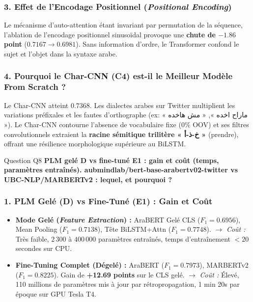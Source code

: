 \documentclass[11pt,a4paper]{article}
\begin{document}
\subsubsection*{3. Effet de l'Encodage Positionnel (\textit{Positional Encoding})}
Le mécanisme d'auto-attention étant invariant par permutation de la séquence, l'ablation de l'encodage positionnel sinusoïdal provoque une \textbf{chute de $-1.86$ point} ($0.7167 \to 0.6981$). Sans information d'ordre, le Transformer confond le sujet et l'objet dans la syntaxe arabe.

\subsubsection*{4. Pourquoi le Char-CNN (C4) est-il le Meilleur Modèle From Scratch ?}
Le Char-CNN atteint $\mathbf{0.7368}$. Les dialectes arabes sur Twitter multiplient les variations préfixales et les fautes d'orthographe (ex: « ماراح اخده », « مش هاخده »). Le Char-CNN contourne l'absence de vocabulaire fixe ($0\%$ OOV) et ses filtres convolutionnels extraient la \textbf{racine sémitique trilitère « خ-ذ-أ »} (prendre), offrant une résilience morphologique supérieure au BiLSTM.

\vspace{0.3cm}

\begin{questionbox}{Question Q8}
\textbf{PLM gelé D vs fine-tuné E1 : gain et coût (temps, paramètres entraînés). aubmindlab/bert-base-arabertv02-twitter vs UBC-NLP/MARBERTv2 : lequel, et pourquoi ?}
\end{questionbox}

\subsubsection*{1. PLM Gelé (D) vs Fine-Tuné (E1) : Gain et Coût}
\begin{itemize}[noitemsep]
    \item \textbf{Mode Gelé (\textit{Feature Extraction}) :} AraBERT Gelé CLS ($F_1 = 0.6956$), Mean Pooling ($F_1 = 0.7138$), Tête BiLSTM+Attn ($F_1 = 0.7748$).  
    $\to$ \textit{Coût :} Très faible, $2\,300$ à $400\,000$ paramètres entraînés, temps d'entraînement $< 20$ secondes sur CPU.
    \item \textbf{Fine-Tuning Complet (Dégelé) :} AraBERT ($F_1 = 0.7973$), MARBERTv2 ($F_1 = \mathbf{0.8225}$). Gain de \textbf{+12.69 points} sur le CLS gelé.  
    $\to$ \textit{Coût :} Élevé, 110 millions de paramètres mis à jour par rétropropagation, 1 min 20s par époque sur GPU Tesla T4.
\end{itemize}
\end{document}

